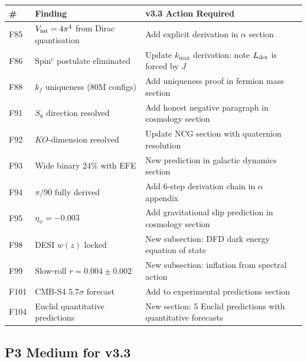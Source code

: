 \documentclass[11pt,a4paper]{article}
\begin{document}
\begin{longtable}{|p{0.6cm}|p{4cm}|p{9cm}|}
\hline
\textbf{\#} & \textbf{Finding} & \textbf{v3.3 Action Required} \\
\hline
F85 & $V_{\rm int} = 4\pi^4$ from Dirac quantisation & Add explicit derivation in $\alpha$ section \\
\hline
F86 & Spin$^c$ postulate eliminated & Update $k_{\max}$ derivation: note $L_{\rm det}$ is forced by $J$ \\
\hline
F88 & $k_f$ uniqueness (80M configs) & Add uniqueness proof in fermion mass section \\
\hline
F91 & $S_8$ direction resolved & Add honest negative paragraph in cosmology section \\
\hline
F92 & $KO$-dimension resolved & Update NCG section with quaternion resolution \\
\hline
F93 & Wide binary 24\% with EFE & New prediction in galactic dynamics section \\
\hline
F94 & $\pi/90$ fully derived & Add 6-step derivation chain in $\alpha$ appendix \\
\hline
F95 & $\eta_\psi = -0.003$ & Add gravitational slip prediction in cosmology section \\
\hline
F98 & DESI $w(z)$ locked & New subsection: DFD dark energy equation of state \\
\hline
F99 & Slow-roll $r = 0.004 \pm 0.002$ & New subsection: inflation from spectral action \\
\hline
F101 & CMB-S4 $5.7\sigma$ forecast & Add to experimental predictions section \\
\hline
F104 & Euclid quantitative predictions & New section: 5 Euclid predictions with quantitative forecasts \\
\hline
\end{longtable}

\subsection{P3 Medium for v3.3}
\end{document}
